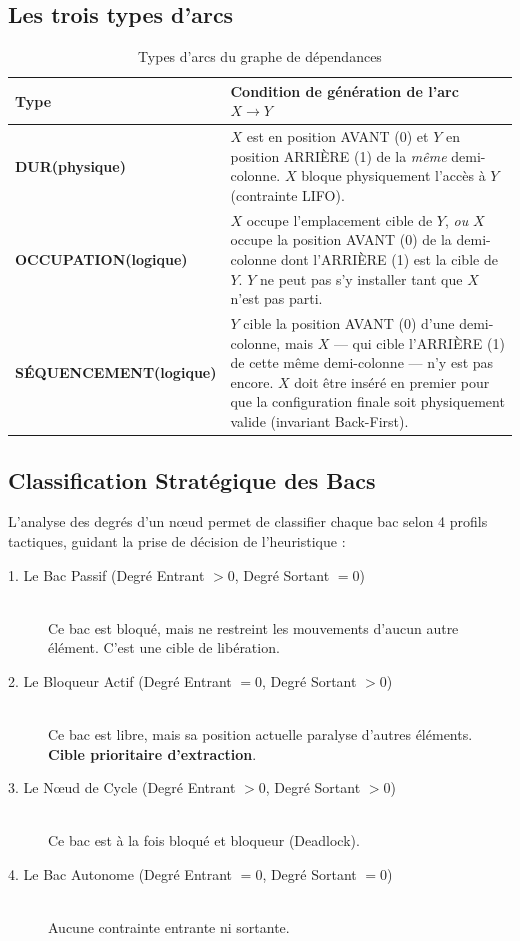 \documentclass[11pt,a4paper]{article}
\begin{document}
\subsection{Les trois types d'arcs}

\begin{table}[H]
\centering
\renewcommand{\arraystretch}{1.35}
\begin{tabular}{>{\bfseries}p{3.5cm} p{10.2cm}}
\toprule
Type & Condition de génération de l'arc $X \to Y$ \\
\midrule
DUR\newline(physique) &
  $X$ est en position AVANT (0) et $Y$ en position ARRIÈRE (1) de la
  \emph{même} demi-colonne. $X$ bloque physiquement l'accès à $Y$
  (contrainte LIFO). \\
\addlinespace
OCCUPATION\newline(logique) &
  $X$ occupe l'emplacement cible de $Y$, \emph{ou} $X$ occupe la
  position AVANT (0) de la demi-colonne dont l'ARRIÈRE (1) est la cible de $Y$.
  $Y$ ne peut pas s'y installer tant que $X$ n'est pas parti. \\
\addlinespace
SÉQUENCEMENT\newline(logique) &
  $Y$ cible la position AVANT (0) d'une demi-colonne, mais $X$ — qui cible
  l'ARRIÈRE (1) de cette même demi-colonne — n'y est pas encore. $X$ doit
  être inséré en premier pour que la configuration finale soit
  physiquement valide (invariant Back-First). \\
\bottomrule
\end{tabular}
\caption{Types d'arcs du graphe de dépendances}
\end{table}

\subsection{Classification Stratégique des Bacs}
L'analyse des degrés d'un nœud permet de classifier chaque bac selon 4 profils tactiques, guidant la prise de décision de l'heuristique :
\begin{description}
    \item[1. Le Bac Passif (Degré Entrant $>0$, Degré Sortant $=0$)] \hfill \\
    Ce bac est bloqué, mais ne restreint les mouvements d'aucun autre élément. C'est une cible de libération.
    \item[2. Le Bloqueur Actif (Degré Entrant $=0$, Degré Sortant $>0$)] \hfill \\
    Ce bac est libre, mais sa position actuelle paralyse d'autres éléments. \textbf{Cible prioritaire d'extraction}.
    \item[3. Le Nœud de Cycle (Degré Entrant $>0$, Degré Sortant $>0$)] \hfill \\
    Ce bac est à la fois bloqué et bloqueur (Deadlock).
    \item[4. Le Bac Autonome (Degré Entrant $=0$, Degré Sortant $=0$)] \hfill \\
    Aucune contrainte entrante ni sortante.
\end{description}
\end{document}
